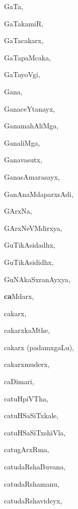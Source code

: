 \begin{multicols}{3}
{\noindent
{GaTa}, \pageref{GaTa}

\noindent
{GaTakamiR}, \pageref{GaTakamiR}

\noindent
{GaTacakarx}, \pageref{GaTacakarx}

\noindent
{GaTapaMcaka}, \pageref{GaTapaMcaka}

\noindent
{GaTayoVgi}, \pageref{GaTayoVgi}

\noindent
{Gana}, \pageref{Gana}

\noindent
{GanaceYtanayx}, \pageref{GanaceYtanayx}

\noindent
{GanamahAliMga}, \pageref{GanamahAliMga}

\noindent
{GanaliMga}, \pageref{GanaliMga}

\noindent
{Ganavasutx}, \pageref{Ganavasutx}

\noindent
{GanasAmarasayx}, \pageref{GanasAmarasayx}

\noindent
{GanAnaMdaparxsAdi}, \pageref{GanAnaMdaparxsAdi}

\noindent
{GArxNa}, \pageref{GArxNa}

\noindent
{GArxNeVMdirxya}, \pageref{GArxNeVMdirxya}

\noindent
{GuTikAsidadhx}, \pageref{GuTikAsidadhx}

\noindent
{GuTikAsididhx}, \pageref{GuTikAsididhx}

\noindent
{GuNAkaSxranAyxya}, \pageref{GuNAkaSxranAyxya}

\noindent
{{\large\textbf{ca}}Mdarx}, \pageref{caMdarx}

\noindent
{cakarx}, \pageref{cakarx}

\noindent
{cakarxkaMthe}, \pageref{cakarxkaMthe}

\noindent
{cakarx (padamxgaLu)}, \pageref{cakarx (padamxgaLu)}

\noindent
{cakarxmuderx}, \pageref{cakarxmuderx}

\noindent
{caDimari}, \pageref{caDimari}

\noindent
{catuHpiVTha}, \pageref{catuHpiVTha}

\noindent
{catuHSaSiTxkale}, \pageref{catuHSaSiTxkale}

\noindent
{catuHSaSiTxshiVla}, \pageref{catuHSaSiTxshiVla}

\noindent
{catugArxRma}, \pageref{catugArxRma}

\noindent
{catudaRshaBuvana}, \pageref{catudaRshaBuvana}

\noindent
{catudaRshamanu}, \pageref{catudaRshamanu}

\noindent
{catudaRshavideyx}, \pageref{catudaRshavideyx}

}
\end{multicols}

